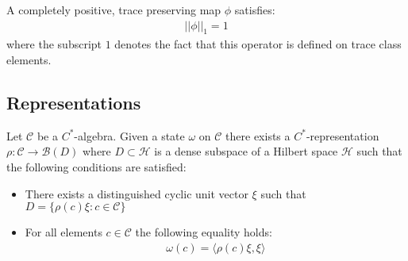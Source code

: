 	\begin{property}
		A completely positive, trace preserving map $\phi$ satisfies:
		\begin{gather}
			||\phi||_1 = 1
		\end{gather}
		where the subscript $1$ denotes the fact that this operator is defined on trace class elements.
	\end{property}
	

\subsection{Representations}
	
	
	\begin{construct}
		Let $\mathcal{C}$ be a $C^*$-algebra. Given a state $\omega$ on $\mathcal{C}$ there exists a $C^*$-representation $\rho:\mathcal{C}\rightarrow\mathcal{B}(D)$ where $D\subset\mathcal{H}$ is a dense subspace of a Hilbert space $\mathcal{H}$ such that the following conditions are satisfied:
		\begin{itemize}
			\item There exists a distinguished cyclic unit vector $\xi$ such that $D = \{\rho(c)\xi: c\in\mathcal{C}\}$
			\item For all elements $c\in\mathcal{C}$ the following equality holds:
			\begin{gather}
				\omega(c) = \langle \rho(c)\xi,\xi \rangle
			\end{gather}
		\end{itemize}
	\end{construct}
	
